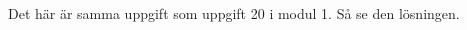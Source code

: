 \documentclass[../../main.tex]{subfiles}
\begin{document}
\begin{solution}{1}

Det här är samma uppgift som uppgift 20 i modul 1. Så se den lösningen.

\end{solution}
\end{document}
